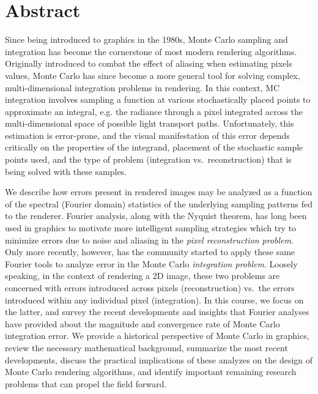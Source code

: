 \documentclass[11pt,fleqn]{book} %
\begin{document}
\newpage




{

{}
{}
\section*{Abstract}
Since being introduced to graphics in the 1980s, Monte Carlo sampling and integration has become the cornerstone of most modern rendering algorithms. Originally introduced to combat the effect of aliasing  when estimating pixels values, Monte Carlo has since become a more general tool for solving complex, multi-dimensional integration problems in rendering. In this context, MC integration involves sampling a function at various stochastically placed points to approximate an integral, e.g. the radiance through a pixel integrated across the multi-dimensional space of possible light transport paths. Unfortunately, this estimation is error-prone, and the visual manifestation of this error depends critically on the properties of the integrand, placement of the stochastic sample points used, and the type of problem (integration vs.\ reconstruction) that is being solved with these samples.

We describe how errors present in rendered images may be analyzed as a function of the spectral (Fourier domain) statistics of the underlying sampling patterns fed to the renderer.  Fourier analysis, along with the Nyquist theorem, has long been used in graphics to motivate more intelligent sampling strategies which try to minimize errors due to noise and aliasing in the \textit{pixel reconstruction problem}. Only more recently, however, has the community started to apply these same Fourier tools to analyze error in the Monte Carlo \textit{integration problem}. Loosely speaking, in the context of rendering a 2D image, these two problems are concerned with errors introduced across pixels (reconstruction) vs.\ the errors introduced within any individual pixel (integration). In this course, we focus on the latter, and survey the recent developments and insights that Fourier analyses have provided about the magnitude and convergence rate of Monte Carlo integration error. We provide a historical perspective of Monte Carlo in graphics, review the necessary mathematical background, summarize the most recent developments, discuss the practical implications of these analyzes on the design of Monte Carlo rendering algorithms, and identify important remaining research problems that can propel the field forward.


}
\end{document}
